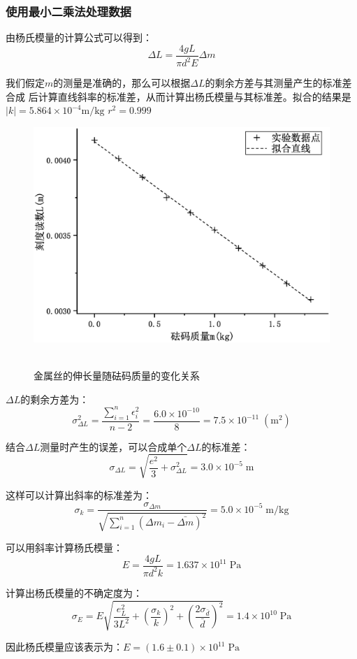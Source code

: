 \documentclass[a4paper]{ctexart}
\def\m{\mathrm{m}}
\begin{document}
	\subsubsection{使用最小二乘法处理数据}
	\par 
	由杨氏模量的计算公式可以得到：
	$$
	\Delta L = \frac{4 g L}{\pi d^{2} E} \Delta m 
	$$
	\par 
	我们假定$m$的测量是准确的，那么可以根据$\Delta L$的剩余方差与其测量产生的标准差合成
	后计算直线斜率的标准差，从而计算出杨氏模量与其标准差。拟合的结果是$|k|=5.864 \times 10^{-4}\mathrm{m/kg}$
	$r^2=0.999$
	\begin{figure}[htbp]
		\centering
		\includegraphics[scale = 0.4]{1_curve.eps}\
		\caption{金属丝的伸长量随砝码质量的变化关系}
	\end{figure}
	\par 
	$\Delta L$的剩余方差为：
	$$
	\sigma_{\Delta L}^{2} = \frac{\sum_{i=1}^{n} \epsilon_{i}^{2}}{n-2} = \frac{6.0 \times 10^{-10}}{8} = 7.5 \times 10^{-11} \;(\mathrm{m^{2}})
	$$
	\par 
	结合$\Delta L$测量时产生的误差，可以合成单个$\Delta L$的标准差：
	$$
	\sigma_{\Delta L} = \sqrt{\frac{e^{2}}{3} + \sigma_{\Delta L}^{2}} = 3.0 \times 10^{-5}\;\m
	$$
	\par 
	这样可以计算出斜率的标准差为：
	$$
	\sigma_{k} = \frac{\sigma_{\Delta m}}{\sqrt{\sum_{i=1}^{n}(\Delta m_{i} - \bar{\Delta m})^{2}}}
	 = 5.0 \times 10^{-5} \; \mathrm{m/kg}
	$$
	\par
	可以用斜率计算杨氏模量：
	$$
	E = \frac{4 g L}{\pi d^{2} k} = 1.637 \times 10^{11} \; \mathrm{Pa}
	$$
	\par 
	计算出杨氏模量的不确定度为：
	$$
	\sigma_{E} = E \sqrt{\frac{e_{L}^{2}}{3L^{2}} + \left(\frac{\sigma_{k}}{k}\right)^{2}
	 + \left(\frac{2\sigma_{\bar{d}}}{\bar{d}}\right)^{2}}
	 = 1.4 \times 10^{10} \;\mathrm{Pa}
	$$
	\par
	因此杨氏模量应该表示为：$E = (1.6 \pm 0.1)\times 10^{11} \;\mathrm{Pa}$
\end{document}
